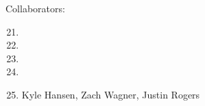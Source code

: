 \documentclass[12pt,letterpaper]{article}
\begin{document}
Collaborators:
\begin{enumerate}
\setcounter{enumi}{20}
\item 
\setcounter{enumi}{22}
\item 

\item 

\item 

\item Kyle Hansen, Zach Wagner, Justin Rogers
\end{enumerate}
\end{document}

